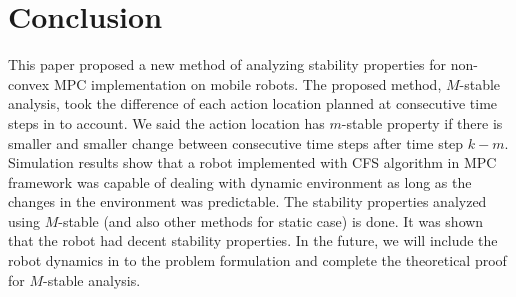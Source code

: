 \documentclass{ifacconf}
\begin{document}
\section{Conclusion}

This paper proposed a new method of analyzing stability properties for non-convex MPC implementation on mobile robots. The proposed method, $M$-stable analysis, took the difference of each action location planned at consecutive time steps in to account. We said the action location has $m$-stable property if there is smaller and smaller change between consecutive time steps after time step $k-m$. Simulation  results show that a robot implemented with CFS algorithm in MPC framework was capable of dealing with dynamic environment as long as the changes in the environment was predictable. The stability properties analyzed using $M$-stable (and also other methods for static case) is done. It was shown that the robot had decent stability properties. In the future, we will include the robot dynamics in to the problem formulation and complete the theoretical proof for $M$-stable analysis.



\end{document}

